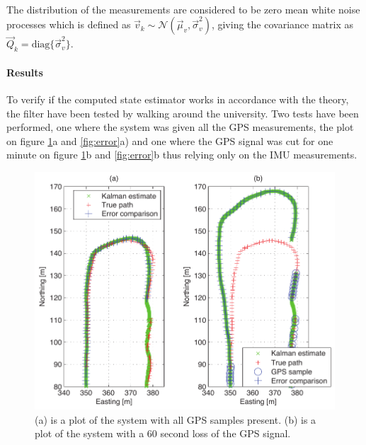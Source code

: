 \documentclass[a0,portrait]{a0poster}
\begin{document}
\begin{center}
{\paragraph{}
The distribution of the measurements are considered to be zero mean white noise processes which is defined as $\vec{v}_k \sim \mathcal{N}(\vec{\mu}_v,\vec{\sigma}^2_v)$, giving the covariance matrix as $\vec{Q}_k = \text{diag}\{\vec{\sigma}^2_v\}$. 

\paragraph{Results}
To verify if the computed state estimator works in accordance with the theory, the filter have been tested by walking around the university. Two tests have been performed, one where the system was given all the GPS measurements, the plot on figure \ref{fig:path}a and \ref{fig:error}a) and one where the GPS signal was cut for one minute on figure \ref{fig:path}b and \ref{fig:error}b thus relying only on the IMU measurements.
\begin{figure}
	\centering %
	\includegraphics[width=\threecolwidth]{img/track}
  	\caption{(a) is a plot of the system with all GPS samples present. (b) is a plot of the system with a 60 second loss of the GPS signal.}
	\label{fig:path}
\end{figure}
\begin{figure}
	\centering %

\end{figure}}
\end{center}
\end{document}
